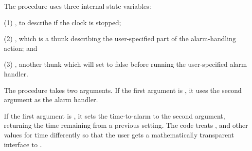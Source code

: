\n
The  procedure uses three internal state
variables:

(1) , to describe if the clock is stopped;

(2) , which is a thunk
describing the user-specified part of the
alarm-handling action; and

(3) , another thunk which
will set  to false before running the
user-specified alarm handler.

The  procedure takes two arguments.  If the
first argument is , it uses the second
argument as the alarm handler.

If the first argument is , it sets the
time-to-alarm to the second argument, returning the
time remaining from a previous setting.  The code
treats ,  and other values for time
differently so that the user gets a mathematically
transparent interface to .

